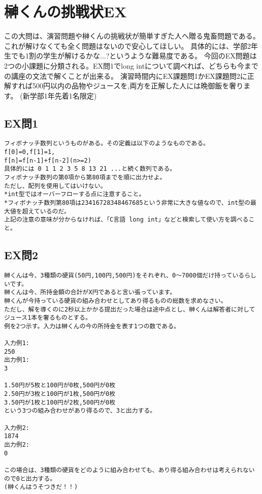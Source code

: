 \documentclass[a4j,titlepage,dvipdfmx]{jsarticle}   %
\begin{document}
\section{榊くんの挑戦状EX}
この大問は、演習問題や榊くんの挑戦状が簡単すぎた人へ贈る鬼畜問題である。
これが解けなくても全く問題はないので安心してほしい。
具体的には、学部2年生でも1割の学生が解けるかな...?というような難易度である。
今回のEX問題は2つの小課題に分類される。EX問1でlong intについて調べれば、どちらも今までの講座の文法で解くことが出来る。
演習時間内にEX課題問1かEX課題問2に正解すれば500円以内の品物やジュースを,両方を正解した人には晩御飯を奢ります。
(新学部1年先着1名限定)

\subsection{EX問1}
\begin{verbatim}
フィボナッチ数列というものがある。その定義は以下のようなものである。
f[0]=0,f[1]=1,
f[n]=f[n-1]+f[n-2](n>=2)
具体的には 0 1 1 2 3 5 8 13 21 ...と続く数列である。
フィボナッチ数列の第0項から第80項までを順に出力せよ。
ただし、配列を使用してはいけない。
*int型ではオーバーフローする点に注意すること。
*フィボナッチ数列第80項は23416728348467685という非常に大きな値なので、int型の最大値を超えているのだ。
上記の注意の意味が分からなければ、「C言語 long int」などと検索して使い方を調べること。
\end{verbatim}

\subsection{EX問2}
\begin{verbatim}
榊くんは今、3種類の硬貨(50円,100円,500円)をそれぞれ、0～7000個だけ持っているらしいです。
榊くんは今、所持金額の合計がX円であると言い張っています。
榊くんが今持っている硬貨の組み合わせとしてあり得るものの総数を求めなさい。
ただし、解を導くのに2秒以上かかる提出だった場合は途中点とし、榊くんは解答者に対してジュース1本を奢るものとする。
例を2つ示す。入力は榊くんの今の所持金を表す1つの数である。

入力例1:
250
出力例1:
3

1.50円が5枚と100円が0枚,500円が0枚
2.50円が3枚と100円が1枚,500円が0枚
3.50円が1枚と100円が2枚,500円が0枚
という3つの組み合わせがあり得るので、3と出力する。

入力例2:
1874
出力例2:
0

この場合は、3種類の硬貨をどのように組み合わせても、あり得る組み合わせは考えられないので0と出力する。
(榊くんはうそつきだ！！)
\end{verbatim}
\end{document}
